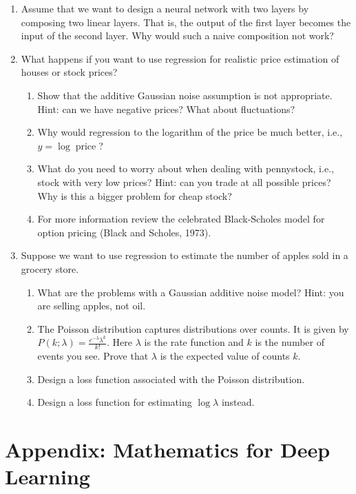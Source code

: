 \documentclass{article}
\begin{document}
\begin{enumerate}[label=\arabic*.]
\begin{enumerate}[label=\arabic*.]
	\end{enumerate}
\item Assume that we want to design a neural network with two layers by composing two linear layers. That is, the output of the first layer becomes the input of the second layer. Why would such a naive composition not work?
\item What happens if you want to use regression for realistic price estimation of houses or stock prices?
	\begin{enumerate}[label=\arabic*.]
	\item Show that the additive Gaussian noise assumption is not appropriate. Hint: can we have negative prices? What about fluctuations?
	\item Why would regression to the logarithm of the price be much better, i.e., $y = \log \operatorname{price}$?
	\item What do you need to worry about when dealing with pennystock, i.e., stock with very low prices? Hint: can you trade at all possible prices? Why is this a bigger problem for cheap stock?
	\item For more information review the celebrated Black-Scholes model for option pricing (Black and Scholes, 1973).
	\end{enumerate}
\item Suppose we want to use regression to estimate the number of apples sold in a grocery store.
	\begin{enumerate}[label=\arabic*.]
	\item What are the problems with a Gaussian additive noise model? Hint: you are selling apples, not oil.
	\item The Poisson distribution captures distributions over counts. It is given by $P(k; \lambda) = \frac{e^{-\lambda} \lambda^k}{k!}$. Here $\lambda$ is the rate function and $k$ is the number of events you see. Prove that $\lambda$ is the expected value of counts $k$.
	\item Design a loss function associated with the Poisson distribution.
	\item Design a loss function for estimating $\log \lambda$ instead.
	\end{enumerate}
\end{enumerate}

\newpage
\setcounter{section}{22}
\section{Appendix: Mathematics for Deep Learning}
\end{document}
